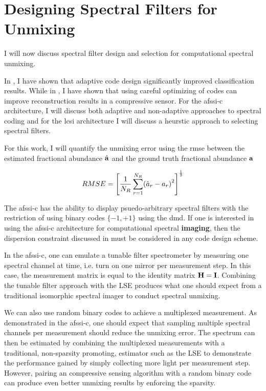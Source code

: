 \section{Designing Spectral Filters for Unmixing}

I will now discuss spectral filter design and selection for computational spectral unmixing. 

In , I have shown that adaptive code design significantly improved classification results. While in , I have shown that using careful optimizing of codes can improve reconstruction results in a compressive sensor. For the \gls{afssi-c} architecture, I will discuss both adaptive and non-adaptive approaches to spectral coding and for the \gls{lcsi} architecture I will discuss a heurstic approach to selecting spectral filters. 

For this work, I will quantify the unmixing error using the \acrfull{rmse} between the estimated fractional abundance $\hat{ \displaystyle \mathbf{a} }$ and the ground truth fractional abundance $\displaystyle \mathbf{a}$

\begin{equation}
	RMSE =  \left[ \frac{1}{N_R} \sum_{r = 1}^{N_{R}} \ap{ \hat{a}_r - a_r }^2 \right]^{\frac{1}{2}}
\end{equation}

The \gls{afssi-c} has the ability to display psuedo-arbitrary spectral filters with the restriction of using binary codes $ \{ -1, +1 \}$ using the \gls{dmd}. If one is interested in using the \gls{afssi-c} architecture for computational spectral \textbf{imaging}, then the dispersion constraint discussed in  must be considered in any code design scheme. 

In the \gls{afssi-c}, one can emulate a tunable filter spectrometer by measuring one spectral channel at time, i.e. turn on one mirror per measurement step. In this case, the measurement matrix is equal to the identity matrix $\displaystyle \mathbf{H} = \displaystyle \mathbf{I}$. Combining the tunable filter approach with the LSE produces what one should expect from a traditional isomorphic spectral imager to conduct spectral unmixing.

We can also use random binary codes to achieve a multiplexed measurement. As demonstrated in the \gls{afssi-c}, one should expect that sampling multiple spectral channels per measurement should reduce the unmixing error. The spectrum can then be estimated by combining the multiplexed measurements with a traditional, non-sparsity promoting, estimator such as the LSE to demonstrate the performance gained by simply collecting more light per measurement step. However, pairing an compressive sensing algorithm with a random binary code can produce even better unmixing results by enforcing the sparsity. 

